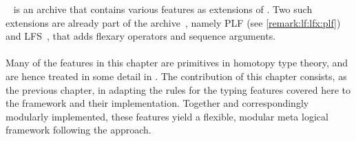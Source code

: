 ~\cite{mmtlfx:git} is an \mmt archive that contains various features as extensions of \LF. Two such extensions are already part of the  archive~\cite{MMTUR:git}, namely \textsf{PLF} (see \autoref{remark:lf:lfx:plf}) and \textsf{LFS}~\cite{HKR:flexary:14}, that adds flexary operators and sequence arguments.


\paragraph{} %

Many of the features in this chapter are primitives in homotopy type theory, and are hence treated in some detail in \cite{hottbook}. The contribution of this chapter consists, as the previous chapter, in adapting the rules for the typing features covered here to the \mmt framework and their implementation. Together and correspondingly modularly implemented, these features yield a flexible, modular meta logical framework following the \latin approach.